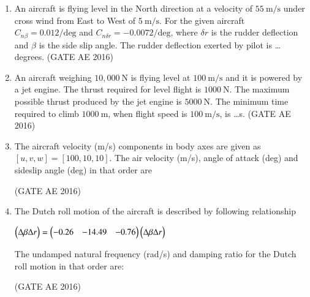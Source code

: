 \documentclass[journal,12pt,onecolumn]{IEEEtran}
\theoremstyle{remark}
\begin{document}
\begin{enumerate}
\item An aircraft is flying level in the North direction at a velocity of $55~\mathrm{m/s}$ under cross wind from East to West of $5~\mathrm{m/s}$. For the given aircraft $C_{n\beta} = 0.012/\text{deg}$ and $C_{n\delta r} = -0.0072/\text{deg}$, where $\delta r$ is the rudder deflection and $\beta$ is the side slip angle. The rudder deflection exerted by pilot is \dots degrees.
\hfill(GATE AE 2016)



\item An aircraft weighing $10,000~\mathrm{N}$ is flying level at $100~\mathrm{m/s}$ and it is powered by a jet engine. The thrust required for level flight is $1000~\mathrm{N}$. The maximum possible thrust produced by the jet engine is $5000~\mathrm{N}$. The minimum time required to climb $1000~\mathrm{m}$, when flight speed is $100~\mathrm{m/s}$, is \dots s.
\hfill(GATE AE 2016)



\item The aircraft velocity (m/s) components in body axes are given as $[u, v, w] = [100, 10, 10]$. The air velocity (m/s), angle of attack (deg) and sideslip angle (deg) in that order are
\begin{enumerate}
\end{enumerate}
\hfill(GATE AE 2016)



\item The Dutch roll motion of the aircraft is described by following relationship

$
\begin{pmatrix}\Delta \beta  \Delta r\end{pmatrix}
=
\begin{pmatrix}-0.26 & -1  4.49 & -0.76\end{pmatrix}
\begin{pmatrix}\Delta \beta  \Delta r\end{pmatrix}
$

The undamped natural frequency (rad/s) and damping ratio for the Dutch roll motion in that order are:
\begin{enumerate}
\end{enumerate}
\hfill(GATE AE 2016)




\end{enumerate}
\end{document}
